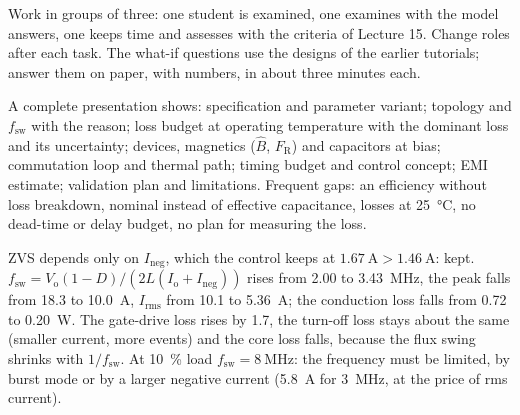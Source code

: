 
Work in groups of three: one student is examined, one examines with the model answers, one keeps time and assesses with the criteria of Lecture 15. Change roles after each task. The what-if questions use the designs of the earlier tutorials; answer them on paper, with numbers, in about three minutes each.




\begin{solutionblock}
	A complete presentation shows: specification and parameter variant; topology and $f_\mathrm{sw}$ with the reason; loss budget at operating temperature with the dominant loss and its uncertainty; devices, magnetics ($\hat{B}$, $F_\mathrm{R}$) and capacitors at bias; commutation loop and thermal path; timing budget and control concept; EMI estimate; validation plan and limitations. Frequent gaps: an efficiency without loss breakdown, nominal instead of effective capacitance, losses at \SI{25}{\celsius}, no dead-time or delay budget, no plan for measuring the loss.
\end{solutionblock}




\begin{solutionblock}
	ZVS depends only on $I_\mathrm{neg}$, which the control keeps at $\SI{1.67}{\ampere}>\SI{1.46}{\ampere}$: kept. $f_\mathrm{sw}=V_\mathrm{o}(1-D)/(2L(I_\mathrm{o}+I_\mathrm{neg}))$ rises from 2.00 to \SI{3.43}{\mega\hertz}, the peak falls from 18.3 to \SI{10.0}{\ampere}, $I_\mathrm{rms}$ from 10.1 to \SI{5.36}{\ampere}; the conduction loss falls from 0.72 to \SI{0.20}{\watt}. The gate-drive loss rises by 1.7, the turn-off loss stays about the same (smaller current, more events) and the core loss falls, because the flux swing shrinks with $1/f_\mathrm{sw}$. At \SI{10}{\percent} load $f_\mathrm{sw}=\SI{8}{\mega\hertz}$: the frequency must be limited, by burst mode or by a larger negative current (\SI{5.8}{\ampere} for \SI{3}{\mega\hertz}, at the price of rms current).
\end{solutionblock}

